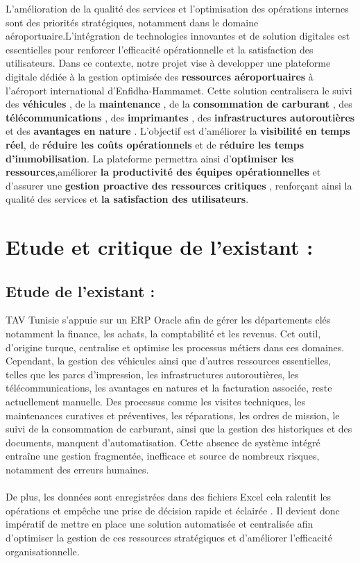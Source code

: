 \documentclass[a4paper,11pt]{report}
\begin{document}
L'amélioration de la qualité des services et l'optimisation des opérations internes sont des priorités stratégiques, notamment dans le domaine aéroportuaire.L'intégration de technologies innovantes et de solution digitales est essentielles pour renforcer l'efficacité opérationnelle et la satisfaction des utilisateurs.
\newline
Dans ce contexte, notre projet vise à developper une plateforme digitale dédiée à la gestion optimisée des \textbf{ ressources aéroportuaires}  à l'aéroport international d'Enfidha-Hammamet. Cette solution centralisera le suivi des \textbf{véhicules} , de la \textbf{maintenance} , de la \textbf{consommation de carburant} , des \textbf{télécommunications} , des \textbf{imprimantes} , des \textbf{infrastructures autoroutières}  et des \textbf{avantages en nature} . L'objectif est d'améliorer la \textbf{visibilité en temps réel}, de \textbf{réduire les coûts opérationnels}  et de  \textbf{réduire les temps d'immobilisation}. La plateforme permettra ainsi d'\textbf{optimiser les ressources},améliorer \textbf{la productivité des équipes opérationnelles}  et d'assurer une \textbf{gestion proactive des ressources critiques}  , renforçant ainsi la qualité des services et \textbf{ la satisfaction des utilisateurs}.

\section{Etude et critique de l'existant : }

\subsection{Etude de l'existant :}

TAV Tunisie s'appuie sur un ERP Oracle afin de gérer les départements clés notamment la finance, les achats, la comptabilité et les revenus. Cet outil, d'origine turque, centralise et optimise les processus métiers dans ces domaines.
\newline
\\
Cependant, la gestion des véhicules ainsi que d'autres ressources essentielles, telles que les parcs d'impression, les infrastructures autoroutières, les télécommunications, les avantages en natures et la facturation associée, reste actuellement manuelle. Des processus comme les visites techniques, les maintenances curatives et préventives, les réparations, les ordres de mission, le suivi de la consommation de carburant, ainsi que la gestion des historiques et des documents, manquent d'automatisation. Cette absence de système intégré entraîne une gestion fragmentée, inefficace et source de nombreux risques, notamment des erreurs humaines.
\\
\\
De plus, les données sont enregistrées dans des fichiers Excel cela ralentit les opérations et empêche une prise de décision rapide et éclairée . Il devient donc impératif de mettre en place une solution automatisée et centralisée afin d'optimiser la gestion de ces ressources stratégiques et d'améliorer l'efficacité organisationnelle. 
\end{document}
